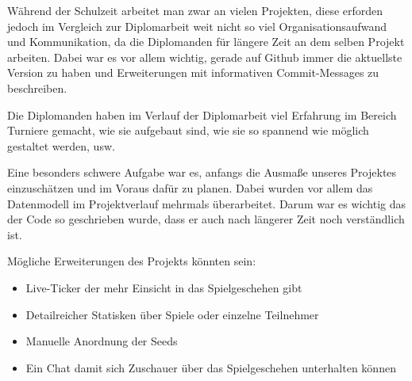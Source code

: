 Während der Schulzeit arbeitet man zwar an vielen Projekten,
diese erforden jedoch im Vergleich zur Diplomarbeit weit nicht so viel Organisationsaufwand und Kommunikation, da die Diplomanden
für längere Zeit an dem selben Projekt arbeiten. Dabei war es vor allem wichtig, gerade auf Github immer die aktuellste Version zu haben und Erweiterungen mit
informativen Commit-Messages zu beschreiben. 

Die Diplomanden haben im Verlauf der Diplomarbeit viel Erfahrung im Bereich Turniere gemacht, wie sie aufgebaut sind, wie sie so spannend wie möglich gestaltet werden, 
usw.

Eine besonders schwere Aufgabe war es, anfangs die Ausmaße unseres Projektes einzuschätzen und im Voraus dafür zu planen. Dabei wurden vor allem das Datenmodell im Projektverlauf mehrmals überarbeitet.
Darum war es wichtig das der Code so geschrieben wurde, dass er auch nach längerer Zeit noch verständlich ist.

Mögliche Erweiterungen des Projekts könnten sein:

\begin{itemize}
    \item Live-Ticker der mehr Einsicht in das Spielgeschehen gibt
    \item Detailreicher Statisken über Spiele oder einzelne Teilnehmer
    \item Manuelle Anordnung der Seeds
    \item Ein Chat damit sich Zuschauer über das Spielgeschehen unterhalten können
\end{itemize}